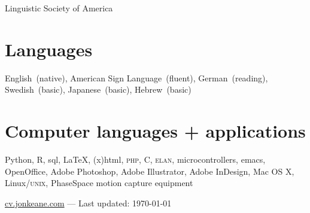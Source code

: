 \documentclass[10pt, letterpaper]{article}
\newcommand{\years}[1]{\marginpar{\scriptsize #1}}
\begin{document}
\-\years{2008--}Linguistic Society of America

\section*{Languages}
\label{sec:languages}
English~(native), American Sign Language~(fluent), German~(reading), Swedish~(basic), Japanese~(basic), Hebrew~(basic)

\section*{Computer languages + applications}
\label{sec:computer}
Python, R, {\sc sql}, \LaTeX, {\sc (x)html}, \textsc{php}, C, \textsc{elan}, microcontrollers, emacs, OpenOffice, Adobe Photoshop, Adobe Illustrator, Adobe InDesign, Mac OS X, Linux/\textsc{unix}, PhaseSpace motion capture equipment

\vfill{}
\hrulefill
\begin{center}
{\footnotesize \href{http://cv.jonkeane.com}{cv.jonkeane.com} — Last updated: \isodate\today}
\end{center}
\end{document}
